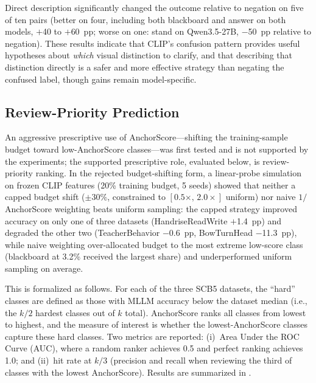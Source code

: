 \documentclass[11pt,a4paper]{article}
\begin{document}
Direct description significantly changed the outcome relative to negation on five of ten pairs (better on four, including both blackboard and answer on both models, $+$40 to $+$60~pp; worse on one: stand on Qwen3.5-27B, $-$50~pp relative to negation). These results indicate that CLIP's confusion pattern provides useful hypotheses about \emph{which} visual distinction to clarify, and that describing that distinction directly is a safer and more effective strategy than negating the confused label, though gains remain model-specific.

\subsection{Review-Priority Prediction}
\label{sec:ranking}

An aggressive prescriptive use of AnchorScore---shifting the training-sample budget toward low-AnchorScore classes---was first tested and is not supported by the experiments; the supported prescriptive role, evaluated below, is review-priority ranking. In the rejected budget-shifting form, a linear-probe simulation on frozen CLIP features (20\% training budget, 5 seeds) showed that neither a capped budget shift ($\pm 30\%$, constrained to $[0.5\times,\,2.0\times]$ uniform) nor naive $1/$AnchorScore weighting beats uniform sampling: the capped strategy improved accuracy on only one of three datasets (HandriseReadWrite $+$1.4~pp) and degraded the other two (TeacherBehavior $-$0.6~pp, BowTurnHead $-$11.3~pp), while naive weighting over-allocated budget to the most extreme low-score class (blackboard at 3.2\% received the largest share) and underperformed uniform sampling on average.

This is formalized as follows. For each of the three SCB5 datasets, the ``hard'' classes are defined as those with MLLM accuracy below the dataset median (i.e., the $k/2$ hardest classes out of $k$ total). AnchorScore ranks all classes from lowest to highest, and the measure of interest is whether the lowest-AnchorScore classes capture these hard classes. Two metrics are reported: (i)~Area Under the ROC Curve (AUC), where a random ranker achieves 0.5 and perfect ranking achieves 1.0; and (ii)~hit rate at $k/3$ (precision and recall when reviewing the third of classes with the lowest AnchorScore). Results are summarized in .
\end{document}
